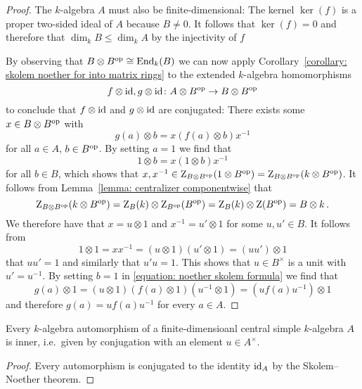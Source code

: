 \begin{proof}
  The $k$-algebra $A$ must also be finite-dimensional:
  The kernel $\ker(f)$ is a proper two-sided ideal of $A$ because $B \neq 0$.
  It follows that $\ker(f) = 0$ and therefore that $\dim_k B \leq \dim_k A$ by the injectivity of $f$
  
  By observing that $B \otimes B^{\mathrm{op}} \cong \operatorname{End}_k(B)$ we can now apply Corollary~\ref{corollary: skolem noether for into matrix rings} to the extended $k$-algebra homomorphisms
  \[
            f \otimes \operatorname{id}, g \otimes \operatorname{id}
    \colon  A \otimes B^{\mathrm{op}}
    \to     B \otimes B^{\mathrm{op}}
  \]
  to conclude that $f \otimes \operatorname{id}$ and $g \otimes \operatorname{id}$ are conjugated:
  There exists some $x \in B \otimes B^{\mathrm{op}}$ with
  \begin{equation}
    \label{equation: noether skolem formula}
      g(a) \otimes b
    = x ( f(a) \otimes b ) x^{-1}
  \end{equation}
  for all $a \in A$, $b \in B^{\mathrm{op}}$.
  By setting $a = 1$ we find that
  \[
      1 \otimes b
    = x (1 \otimes b) x^{-1}
  \]
  for all $b \in B$, which shows that $x, x^{-1} \in \operatorname{Z}_{B \otimes B^{\mathrm{op}}}(1 \otimes B^{\mathrm{op}}) = \operatorname{Z}_{B \otimes B^{\mathrm{op}}}(k \otimes B^{\mathrm{op}})$.
  It follows from Lemma~\ref{lemma: centralizer componentwise} that
  \[
      \operatorname{Z}_{B \otimes B^{\mathrm{op}}}(k \otimes B^{\mathrm{op}})
    = \operatorname{Z}_{B}(k) \otimes \operatorname{Z}_{B^{\mathrm{op}}}(B^{\mathrm{op}})
    = \operatorname{Z}_{B}(k) \otimes \operatorname{Z}(B^{\mathrm{op}})
    = B \otimes k \,.
  \]
  We therefore have that $x = u \otimes 1$ and $x^{-1} = u' \otimes 1$ for some $u, u' \in B$.
  It follows from
  \[
      1 \otimes 1
    = x x^{-1}
    = (u \otimes 1) (u' \otimes 1)
    = (u u') \otimes 1
  \]
  that $u u' = 1$ and similarly that $u' u = 1$.
  This shows that $u \in B^\times$ is a unit with $u' = u^{-1}$.
  By setting $b = 1$ in \eqref{equation: noether skolem formula} we find that
  \[
      g(a) \otimes 1
    = (u \otimes 1) (f(a) \otimes 1) (u^{-1} \otimes 1)
    = (u f(a) u^{-1}) \otimes 1
  \]
  and therefore $g(a) = u f(a) u^{-1}$ for every $a \in A$.
\end{proof}


\begin{corollary}
  \label{corollary: skolem noether for automorphisms}
  Every $k$-algebra automorphism of a finite-dimensioanl central simple $k$-algebra $A$ is inner, i.e.\ given by conjugation with an element $u \in A^\times$.
\end{corollary}


\begin{proof}
  Every automorphism is conjugated to the identity $\operatorname{id}_A$ by the Skolem--Noether theorem.
\end{proof}


